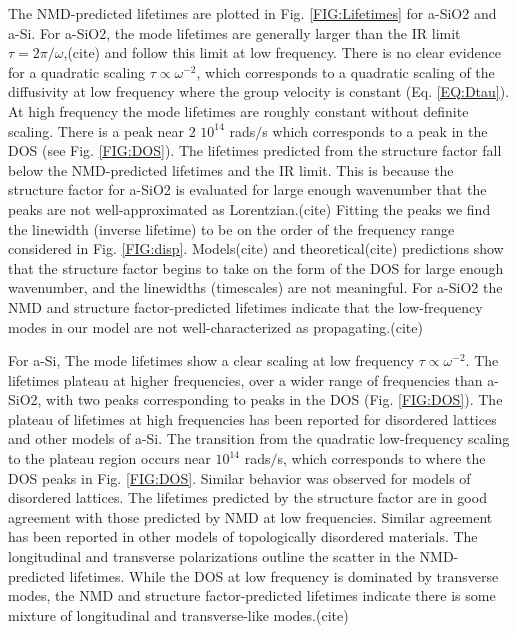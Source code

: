 \documentclass[aps,prb,twocolumn,superscriptaddress,footinbib,amsmath,amssymb,floatfix]{revtex4}
\begin{document}
The NMD-predicted lifetimes are plotted in Fig. \ref{FIG:Lifetimes} 
for a-SiO2 and a-Si. 
For a-SiO2, the mode lifetimes are generally larger than 
the IR limit $\tau = 2\pi/\omega$,(cite) and follow 
this limit at low frequency. There is no clear evidence for a
quadratic scaling $\tau\propto\omega^{-2}$, which 
corresponds to a quadratic scaling of the diffusivity at low 
frequency where the group velocity is constant 
(Eq. \eqref{EQ:Dtau}). 
At high frequency the mode lifetimes are roughly constant 
without definite scaling. There is a peak near 
2 $10^{14}$ rads$/$s which corresponds to a peak in the DOS 
(see Fig. \ref{FIG:DOS}).  The lifetimes predicted from the 
structure factor fall below the NMD-predicted lifetimes 
and the IR limit. This is because the structure factor for 
a-SiO2 is evaluated for large enough wavenumber that the 
peaks are not well-approximated as Lorentzian.(cite) Fitting 
the peaks we find the linewidth (inverse lifetime) 
to be on the order of the frequency range considered in 
Fig. \ref{FIG:disp}. 
Models(cite) and theoretical(cite) predictions show that the 
structure factor begins to take on the form of the DOS 
for large enough wavenumber,
\cite{martin-mayor_dynamical_2001,baldi_thermal_2008} and the 
linewidths (timescales) are not meaningful. For a-SiO2 the NMD and 
structure factor-predicted lifetimes indicate that the 
low-frequency modes 
in our model are not well-characterized as propagating.(cite)  

For a-Si, 
The mode lifetimes show a clear scaling at low frequency 
$\tau\propto\omega^{-2}$. The lifetimes plateau at higher frequencies,
over a wider range of frequencies than a-SiO2, with two peaks 
corresponding to peaks in the DOS (Fig. \ref{FIG:DOS}). The plateau of 
lifetimes at high frequencies has been 
reported for disordered lattices
\cite{sheng_heat_1991,larkin_predicting_2013} and 
other models of a-Si.\cite{he_heat_2011} 
The transition from the quadratic low-frequency scaling to 
the plateau region occurs near 
$10^{14}$ rads$/$s, which corresponds to where the DOS peaks in Fig. 
\ref{FIG:DOS}. 
Similar behavior was observed for models of disordered lattices.
\cite{larkin_predicting_2013} The lifetimes predicted by the 
structure factor are in good agreement with those predicted by NMD 
at low frequencies. Similar agreement has been reported in other 
models of topologically disordered materials.
\cite{mazzacurati_low-frequency_1996} 
The longitudinal and transverse polarizations 
outline the scatter in the NMD-predicted lifetimes. While the DOS 
at low frequency is 
dominated by transverse modes, the NMD and 
structure factor-predicted lifetimes indicate there 
is some mixture of longitudinal and transverse-like modes.(cite) 
\end{document}
